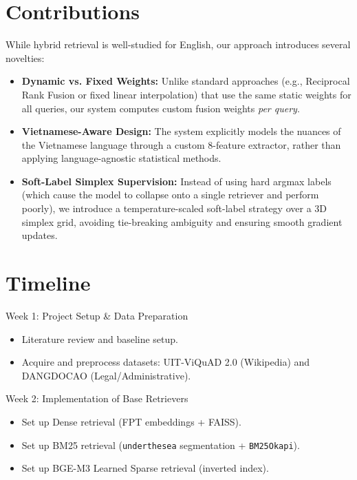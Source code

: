 \documentclass[11pt,a4paper]{article}
\begin{document}
\section{Contributions}
While hybrid retrieval is well-studied for English, our approach introduces several novelties:
\begin{itemize}[leftmargin=*]
    \item \textbf{Dynamic vs. Fixed Weights:} Unlike standard approaches (e.g., Reciprocal Rank Fusion or fixed linear interpolation) that use the same static weights for all queries, our system computes custom fusion weights \emph{per query}.
    \item \textbf{Vietnamese-Aware Design:} The system explicitly models the nuances of the Vietnamese language through a custom 8-feature extractor, rather than applying language-agnostic statistical methods.
    \item \textbf{Soft-Label Simplex Supervision:} Instead of using hard argmax labels (which cause the model to collapse onto a single retriever and perform poorly), we introduce a temperature-scaled soft-label strategy over a 3D simplex grid, avoiding tie-breaking ambiguity and ensuring smooth gradient updates.
\end{itemize}

\section{Timeline}

\begin{timelinebox}{Week 1: Project Setup \& Data Preparation}
\begin{itemize}[leftmargin=*,nosep]
    \item Literature review and baseline setup.
    \item Acquire and preprocess datasets: UIT-ViQuAD 2.0 (Wikipedia) and DANGDOCAO (Legal/Administrative).
\end{itemize}
\end{timelinebox}

\begin{timelinebox}{Week 2: Implementation of Base Retrievers}
\begin{itemize}[leftmargin=*,nosep]
    \item Set up Dense retrieval (FPT embeddings + FAISS).
    \item Set up BM25 retrieval (\texttt{underthesea} segmentation + \texttt{BM25Okapi}).
    \item Set up BGE-M3 Learned Sparse retrieval (inverted index).
\end{itemize}
\end{timelinebox}
\end{document}
